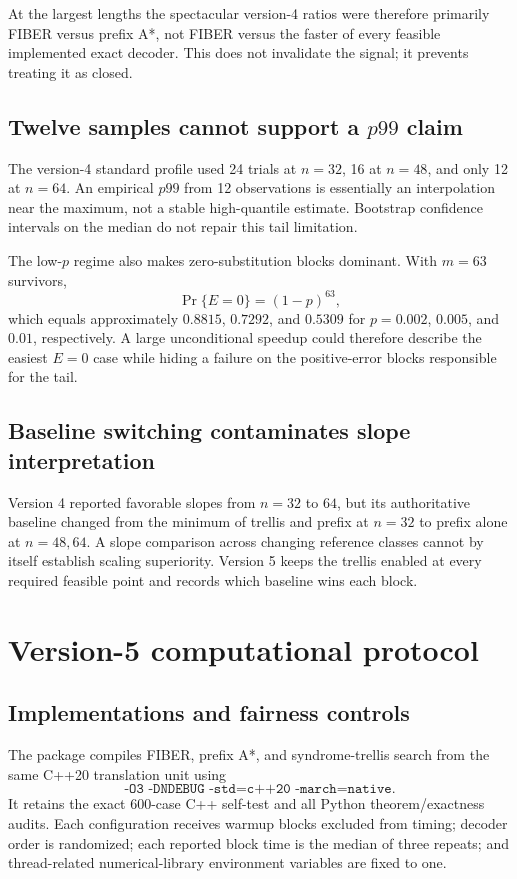\documentclass[11pt]{article}
\theoremstyle{definition}
\theoremstyle{remark}
\begin{document}
At the largest lengths the spectacular version-4 ratios were therefore primarily FIBER versus prefix A*, not FIBER versus the faster of every feasible implemented exact decoder.  This does not invalidate the signal; it prevents treating it as closed.

\subsection{Twelve samples cannot support a $p99$ claim}
The version-4 standard profile used 24 trials at $n=32$, 16 at $n=48$, and only 12 at $n=64$.  An empirical $p99$ from 12 observations is essentially an interpolation near the maximum, not a stable high-quantile estimate.  Bootstrap confidence intervals on the median do not repair this tail limitation.

The low-$p$ regime also makes zero-substitution blocks dominant.  With $m=63$ survivors,
\[
 \Pr\{E=0\}=(1-p)^{63},
\]
which equals approximately $0.8815$, $0.7292$, and $0.5309$ for $p=0.002$, $0.005$, and $0.01$, respectively.  A large unconditional speedup could therefore describe the easiest $E=0$ case while hiding a failure on the positive-error blocks responsible for the tail.

\subsection{Baseline switching contaminates slope interpretation}
Version 4 reported favorable slopes from $n=32$ to $64$, but its authoritative baseline changed from the minimum of trellis and prefix at $n=32$ to prefix alone at $n=48,64$.  A slope comparison across changing reference classes cannot by itself establish scaling superiority.  Version 5 keeps the trellis enabled at every required feasible point and records which baseline wins each block.

\section{Version-5 computational protocol}
\subsection{Implementations and fairness controls}
The package compiles FIBER, prefix A*, and syndrome-trellis search from the same C++20 translation unit using
\[
 \texttt{-O3 -DNDEBUG -std=c++20 -march=native}.
\]
It retains the exact 600-case C++ self-test and all Python theorem/exactness audits.  Each configuration receives warmup blocks excluded from timing; decoder order is randomized; each reported block time is the median of three repeats; and thread-related numerical-library environment variables are fixed to one.
\end{document}
